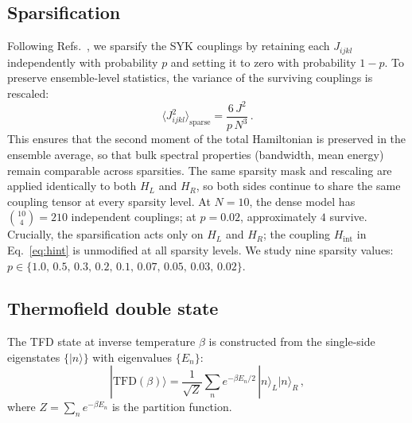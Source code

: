 \documentclass[aps,prd,twocolumn,superscriptaddress,nofootinbib,floatfix]{revtex4-2}
\newcommand{\ket}[1]{| #1 \rangle}
\newcommand{\avg}[1]{\langle #1 \rangle}
\newcommand{\tfd}{\mathrm{TFD}}
\begin{document}
\subsection{Sparsification}
\label{sec:sparsification}

Following
Refs.~\cite{Garcia-Garcia:2020ttf,Xu:2020shn,Jafferis:2022uhu},
we sparsify the SYK couplings by retaining each $J_{ijkl}$ independently
with probability $p$ and setting it to zero with probability $1-p$. To
preserve ensemble-level statistics, the variance of the surviving couplings
is rescaled:
\begin{equation}
  \avg{J_{ijkl}^2}_\mathrm{sparse} = \frac{6\,J^2}{p\,N^3}\,.
  \label{eq:sparse_variance}
\end{equation}
This ensures that the second moment of the total Hamiltonian is preserved in
the ensemble average, so that bulk spectral properties (bandwidth, mean
energy) remain comparable across sparsities. The same sparsity mask and
rescaling are applied identically to both $H_L$ and $H_R$, so both sides
continue to share the same coupling tensor at every sparsity level. At
$N=10$, the dense model has $\binom{10}{4} = 210$ independent couplings; at
$p = 0.02$, approximately $4$ survive. Crucially, the sparsification acts
only on $H_L$ and $H_R$; the coupling $H_\mathrm{int}$ in
Eq.~\eqref{eq:hint} is unmodified at all sparsity levels. We study nine
sparsity values: $p \in \{1.0,\, 0.5,\, 0.3,\, 0.2,\, 0.1,\, 0.07,\, 0.05,\,
0.03,\, 0.02\}$.

\subsection{Thermofield double state}
\label{sec:tfd}

The TFD state at inverse temperature $\beta$ is constructed from the
single-side eigenstates $\{|n\rangle\}$ with eigenvalues $\{E_n\}$:
\begin{equation}
  \ket{\tfd(\beta)} = \frac{1}{\sqrt{Z}} \sum_n e^{-\beta E_n/2}\,
    \ket{n}_L \ket{n}_R\,,
  \label{eq:tfd}
\end{equation}
where $Z = \sum_n e^{-\beta E_n}$ is the partition function.
\end{document}
